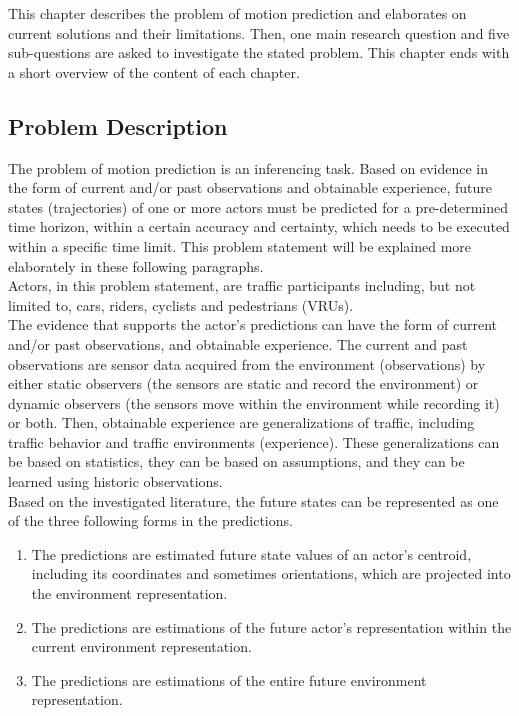 This chapter describes the problem of motion prediction and elaborates on current solutions and their limitations. Then, one main research question and five sub-questions are asked to investigate the stated problem. This chapter ends with a short overview of the content of each chapter.

\subsection{Problem Description} 
The problem of motion prediction is an inferencing task. Based on evidence in the form of current and/or past observations and obtainable experience, future states (trajectories) of one or more actors must be predicted for a pre-determined time horizon, within a certain accuracy and certainty, which needs to be executed within a specific time limit. This problem statement will be explained more elaborately in these following paragraphs. \\

Actors, in this problem statement, are traffic participants including, but not limited to, cars, riders, cyclists and pedestrians (\glspl{VRU}). \\

The evidence that supports the actor's predictions can have the form of current and/or past observations, and obtainable experience. The current and past observations are sensor data acquired from the environment (observations) by either static observers (the sensors are static and record the environment) or dynamic observers (the sensors move within the environment while recording it) or both.
Then, obtainable experience are generalizations of traffic, including traffic behavior and traffic environments (experience). These generalizations can be based on statistics, they can be based on assumptions, and they can be learned using historic observations. \\

Based on the investigated literature, the future states can be represented as one of the three following forms in the predictions. 

\begin{enumerate}
	\item The predictions are estimated future state values of an actor's centroid, including its coordinates and sometimes orientations, which are projected into the environment representation.
	\item The predictions are estimations of the future actor's representation within the current environment representation.
	\item The predictions are estimations of the entire future environment representation.
\end{enumerate}

